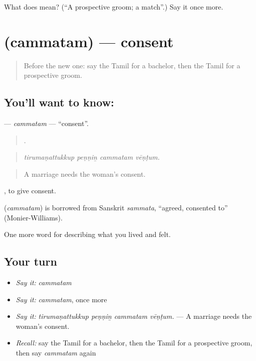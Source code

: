 \begin{tcolorbox}[breakable,colback=teal!4,colframe=teal!35!black,title={Before you move on}]
What does  mean? (\textquotedblleft{}A prospective groom; a match\textquotedblright{}.) Say it once more.
\end{tcolorbox}
\section[\texorpdfstring{\ta{சம்மதம்} (cammatam)}{சம்மதம் (cammatam)}]{ (cammatam) — consent}

\label{lesson:TA-C498-cammatam}



\begin{quote}
Before the new one: say the Tamil for a bachelor, then the Tamil for a prospective groom.
\end{quote}

\subsection*{You'll want to know: }
\textbf{} — \emph{cammatam} — \textquotedblleft{}consent\textquotedblright{}.

\begin{quote}
   .
\end{quote}

\begin{quote}
\emph{tirumaṇattukkup peṇṇiṉ cammatam vēṇṭum.}
\end{quote}

\begin{quote}
A marriage needs the woman’s consent.
\end{quote}

 , to give consent.

\begin{cousinweb}
\textbf{} (\emph{cammatam}) is borrowed from Sanskrit \emph{sammata}, \textquotedblleft{}agreed, consented to\textquotedblright{} (Monier-Williams).
\end{cousinweb}

\begin{grammarlens}[title={What you've built}]
One more word for describing what you lived and felt.
\end{grammarlens}

\subsection*{Your turn}
\begin{itemize}
\raggedright
  \item \emph{Say it:} \emph{cammatam}
  \item \emph{Say it:} \emph{cammatam}, once more
  \item \emph{Say it:} \emph{tirumaṇattukkup peṇṇiṉ cammatam vēṇṭum.} — A marriage needs the woman’s consent.
  \item \emph{Recall:} say the Tamil for a bachelor, then the Tamil for a prospective groom, then say \emph{cammatam} again
\end{itemize}

